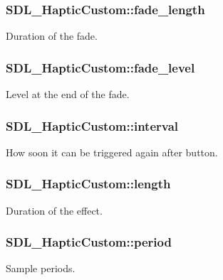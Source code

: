 \subsubsection[{fade\+\_\+length}]{ S\+D\+L\+\_\+\+Haptic\+Custom\+::fade\+\_\+length}\label{struct_s_d_l___haptic_custom_ab47fac94baeba28a3acd6c706e0b6a5c}
Duration of the fade. \hypertarget{struct_s_d_l___haptic_custom_a73a522581eb514d032e500ec6294fe50}{}
\subsubsection[{fade\+\_\+level}]{ S\+D\+L\+\_\+\+Haptic\+Custom\+::fade\+\_\+level}\label{struct_s_d_l___haptic_custom_a73a522581eb514d032e500ec6294fe50}
Level at the end of the fade. \hypertarget{struct_s_d_l___haptic_custom_afdeb26b1709254545e00a59a0a6c360c}{}
\subsubsection[{interval}]{ S\+D\+L\+\_\+\+Haptic\+Custom\+::interval}\label{struct_s_d_l___haptic_custom_afdeb26b1709254545e00a59a0a6c360c}
How soon it can be triggered again after button. \hypertarget{struct_s_d_l___haptic_custom_ad70e8bc2cff74b99d704a757c16b363f}{}
\subsubsection[{length}]{ S\+D\+L\+\_\+\+Haptic\+Custom\+::length}\label{struct_s_d_l___haptic_custom_ad70e8bc2cff74b99d704a757c16b363f}
Duration of the effect. \hypertarget{struct_s_d_l___haptic_custom_aba7fafa808e90baddef25f009b8f4817}{}
\subsubsection[{period}]{ S\+D\+L\+\_\+\+Haptic\+Custom\+::period}\label{struct_s_d_l___haptic_custom_aba7fafa808e90baddef25f009b8f4817}
Sample periods. \hypertarget{struct_s_d_l___haptic_custom_a5905ea1b6182da846535ca8c80b4fa33}{}
